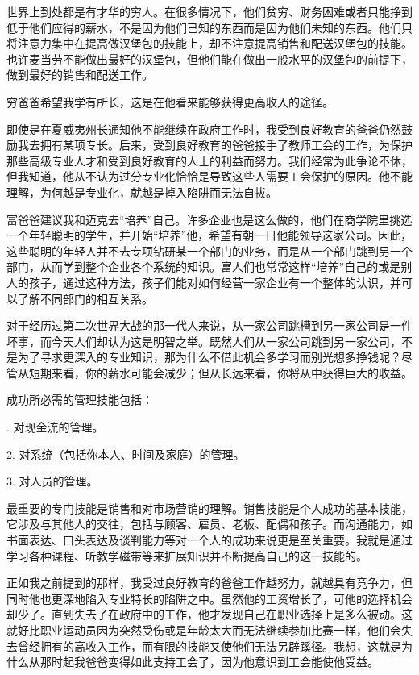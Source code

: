 世界上到处都是有才华的穷人。在很多情况下，他们贫穷、财务困难或者只能挣到低于他们应得的薪水，不是因为他们已知的东西而是因为他们未知的东西。他们只将注意力集中在提高做汉堡包的技能上，却不注意提高销售和配送汉堡包的技能。也许麦当劳不能做出最好的汉堡包，但他们能在做出一般水平的汉堡包的前提下，做到最好的销售和配送工作。

穷爸爸希望我学有所长，这是在他看来能够获得更高收入的途径。

即使是在夏威夷州长通知他不能继续在政府工作时，我受到良好教育的爸爸仍然鼓励我去拥有某项专长。后来，受到良好教育的爸爸接手了教师工会的工作，为保护那些高级专业人才和受到良好教育的人士的利益而努力。我们经常为此争论不休，但我知道，他从不认为过分专业化恰恰是导致这些人需要工会保护的原因。他不能理解，为何越是专业化，就越是掉入陷阱而无法自拔。

富爸爸建议我和迈克去“培养”自己。许多企业也是这么做的，他们在商学院里挑选一个年轻聪明的学生，并开始“培养”他，希望有朝一日他能领导这家公司。因此，这些聪明的年轻人并不去专项钻研某一个部门的业务，而是从一个部门跳到另一个部门，从而学到整个企业各个系统的知识。富人们也常常这样“培养”自己的或是别人的孩子，通过这种方法，孩子们能对如何经营一家企业有一个整体的认识，并可以了解不同部门的相互关系。

对于经历过第二次世界大战的那一代人来说，从一家公司跳槽到另一家公司是一件坏事，而今天人们却认为这是明智之举。既然人们从一家公司跳到另一家公司，不是为了寻求更深入的专业知识，那为什么不借此机会多学习而别光想多挣钱呢？尽管从短期来看，你的薪水可能会减少；但从长远来看，你将从中获得巨大的收益。

成功所必需的管理技能包括：

{. 对现金流的管理。

2. 对系统（包括你本人、时间及家庭）的管理。

3. 对人员的管理。}

最重要的专门技能是销售和对市场营销的理解。销售技能是个人成功的基本技能，它涉及与其他人的交往，包括与顾客、雇员、老板、配偶和孩子。而沟通能力，如书面表达、口头表达及谈判能力等对一个人的成功来说更是至关重要。我就是通过学习各种课程、听教学磁带等来扩展知识并不断提高自己的这一技能的。

正如我之前提到的那样，我受过良好教育的爸爸工作越努力，就越具有竞争力，但同时他也更深地陷入专业特长的陷阱之中。虽然他的工资增长了，可他的选择机会却少了。直到失去了在政府中的工作，他才发现自己在职业选择上是多么被动。这就好比职业运动员因为突然受伤或是年龄太大而无法继续参加比赛一样，他们会失去曾经拥有的高收入工作，而有限的技能又使他们无法另辟蹊径。我想，这就是为什么从那时起我爸爸变得如此支持工会了，因为他意识到工会能使他受益。

